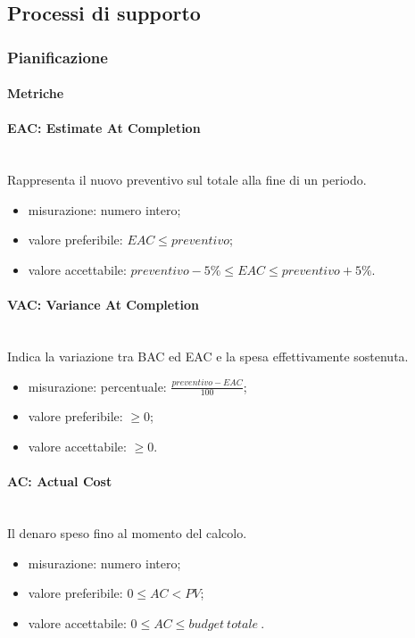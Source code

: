 \subsection{Processi di supporto}
	\subsubsection{Pianificazione}
		\paragraph{Metriche}			
			\paragraph*{EAC: Estimate At Completion}\mbox{}\\
			Rappresenta il nuovo preventivo sul totale alla fine di un periodo.
			\begin{itemize}
				\item  misurazione: numero intero;
				\item  valore preferibile: $ EAC \leq preventivo$;
				\item  valore accettabile: $ preventivo -5\% \leq EAC \leq preventivo + 5\%$. 
			\end{itemize}
			
			\paragraph*{VAC: Variance At Completion}\mbox{}\\
			Indica la variazione tra BAC ed EAC e la spesa effettivamente sostenuta.
			\begin{itemize}
				\item  misurazione: percentuale: $\frac{preventivo - EAC}{100}$;
				\item  valore preferibile: $\geq 0$;
				\item  valore accettabile: $\geq 0$.
			\end{itemize}
				
			\paragraph*{AC: Actual Cost}\mbox{}\\
			Il denaro speso fino al momento del calcolo.
			\begin{itemize}
				\item  misurazione: numero intero;
				\item  valore preferibile: $0 \leq AC < PV$;
				\item  valore accettabile: $0 \leq AC \leq budget\ totale\ $.
			\end{itemize}
		

